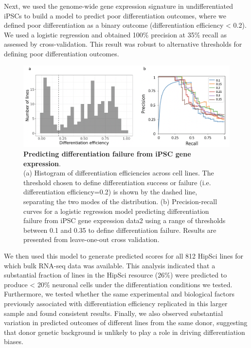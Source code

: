 Next, we used the genome-wide gene expression signature in undifferentiated iPSCs to build a model to predict poor differentiation outcomes, where we defined poor differentiation as a binary outcome (differentiation efficiency < 0.2).
We used a logistic regression and obtained 100\% precision at 35\% recall as assessed by cross-validation. 
This result was robust to alternative thresholds for defining poor differentiation outcomes. 

\begin{figure}[h]
\centering
\includegraphics[width=15.5cm]{Chapter5/Fig/neuroseq_diff_eff_predict.png}
\caption[Predicting differentiation failure from iPSC gene expression]{\textbf{Predicting differentiation failure from iPSC gene expression}.\\
(a) Histogram of differentiation efficiencies across cell lines. 
The threshold chosen to define differentiation success or failure (i.e. differentiation efficiency=0.2) is shown by the dashed line, separating the two modes of the distribution. 
(b) Precision-recall curves for a logistic regression model predicting differentiation failure from iPSC gene expression data2 using a range of thresholds between 0.1 and 0.35 to define differentiation failure. 
Results are presented from leave-one-out cross validation.}
\label{fig:neuroseq_diff_eff_predictor}
\end{figure}

We then used this model to generate predicted scores for all 812 HipSci lines for which bulk RNA-seq data was available.
This analysis indicated that a substantial fraction of lines in the HipSci resource (26\%) were predicted to produce < 20\% neuronal cells under the differentiation conditions we tested.
Furthermore, we tested whether the same experimental and biological factors previously associated with differentiation efficiency replicated in this larger sample and found consistent results.
Finally, we also observed substantial variation in predicted outcomes of different lines from the same donor, suggesting that donor genetic background is unlikely to play a role in driving differentiation biases.

